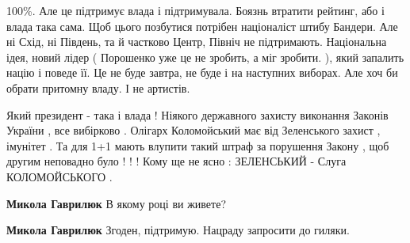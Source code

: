 \begin{itemize}
 

100\%. Але це підтримує влада і підтримувала. Боязнь втратити рейтинг, або і
влада така сама. Щоб цього позбутися потрібен націоналіст штибу Бандери. Але ні
Схід, ні Південь, та й частково Центр, Північ не підтримають. Національна ідея,
новий лідер ( Порошенко уже це не зробить, а міг зробити. ), який запалить
націю і поведе її. Це не буде завтра, не буде і на наступних виборах. Але хоч
би обрати притомну владу. І не артистів.

 

Який президент - така і влада ! Ніякого державного захисту виконання Законів
України , все вибірково . Олігарх Коломойський має від Зеленського захист ,
імунітет . Та для 1+1 мають влупити такий штраф за порушення Закону , щоб
другим неповадно було ! ! ! Кому ще не ясно : ЗЕЛЕНСЬКИЙ - Слуга КОЛОМОЙСЬКОГО
.

\begin{itemize}
 
\textbf{Микола Гаврилюк} В якому році ви живете?

 
\textbf{Микола Гаврилюк} Згоден, підтримую. Нацраду запросити до гиляки.
\end{itemize}

 


\end{itemize}
